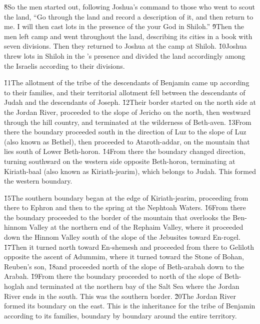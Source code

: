 \v{8}So the men started out, following Joshua's command to those who went to scout the land, ``Go through the land and record a description of it, and then return to me. I will then cast lots in the presence of the  your God in Shiloh.'' \v{9}Then the men left camp and went throughout the land, describing its cities in a book with seven divisions. Then they returned to Joshua at the camp at Shiloh. \v{10}Joshua threw lots in Shiloh in the 's presence and divided the land accordingly among the Israelis according to their divisions.

\v{11}The allotment of the tribe of the descendants of Benjamin came up according to their families, and their territorial allotment fell between the descendants of Judah and the descendants of Joseph. \v{12}Their border started on the north side at the Jordan River, proceeded to the slope of Jericho on the north, then westward through the hill country, and terminated at the wilderness of Beth-aven. \v{13}From there the boundary proceeded south in the direction of Luz to the slope of Luz (also known as Bethel), then proceeded to Ataroth-addar, on the mountain that lies south of Lower Beth-horon. \v{14}From there the boundary changed direction, turning southward on the western side opposite Beth-horon, terminating at Kiriath-baal (also known as Kiriath-jearim), which belongs to Judah. This formed the western boundary.

\v{15}The southern boundary began at the edge of Kiriath-jearim, proceeding from there to Ephron and then to the spring at the Nephtoah Waters. \v{16}From there the boundary proceeded to the border of the mountain that overlooks the Ben-hinnom Valley at the northern end of the Rephaim Valley, where it proceeded down the Hinnom Valley south of the slope of the Jebusites toward En-rogel. \v{17}Then it turned north toward En-shemesh and proceeded from there to Geliloth opposite the ascent of Adummim, where it turned toward the Stone of Bohan, Reuben's son, \v{18}and proceeded north of the slope of Beth-arabah down to the Arabah. \v{19}From there the boundary proceeded to north of the slope of Beth-hoglah and terminated at the northern bay of the Salt Sea where the Jordan River ends in the south. This was the southern border. \v{20}The Jordan River formed its boundary on the east. This is the inheritance for the tribe of Benjamin according to its families, boundary by boundary around the entire territory.

